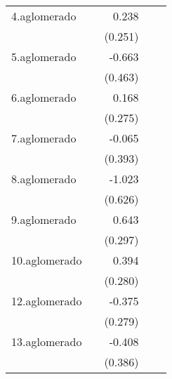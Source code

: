 {\begin{longtable}{l*{4}{D{.}{.}{-1}}}
\addlinespace
4.aglomerado&                     &       0.238         &                     &                     \\
            &                     &     (0.251)         &                     &                     \\
\addlinespace
5.aglomerado&                     &      -0.663         &                     &                     \\
            &                     &     (0.463)         &                     &                     \\
\addlinespace
6.aglomerado&                     &       0.168         &                     &                     \\
            &                     &     (0.275)         &                     &                     \\
\addlinespace
7.aglomerado&                     &      -0.065         &                     &                     \\
            &                     &     (0.393)         &                     &                     \\
\addlinespace
8.aglomerado&                     &      -1.023         &                     &                     \\
            &                     &     (0.626)         &                     &                     \\
\addlinespace
9.aglomerado&                     &       0.643\sym{*}  &                     &                     \\
            &                     &     (0.297)         &                     &                     \\
\addlinespace
10.aglomerado&                     &       0.394         &                     &                     \\
            &                     &     (0.280)         &                     &                     \\
\addlinespace
12.aglomerado&                     &      -0.375         &                     &                     \\
            &                     &     (0.279)         &                     &                     \\
\addlinespace
13.aglomerado&                     &      -0.408         &                     &                     \\
            &                     &     (0.386)         &                     &                     \\

\end{longtable}}
